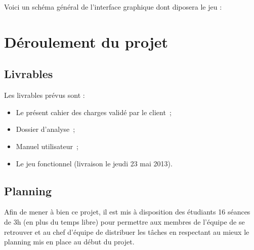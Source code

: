 \documentclass[11pt]{article}
\begin{document}
Voici un schéma général de l'interface graphique dont diposera le jeu :





\newpage %

\section{Déroulement du projet}


\subsection{Livrables}

Les livrables prévus sont :

\begin{itemize}
   \item Le présent cahier des charges validé par le client~;
   \item Dossier d'analyse~;
   \item Manuel utilisateur~;
   \item Le jeu fonctionnel (livraison le jeudi 23 mai 2013).
\end{itemize}


\subsection{Planning}

Afin de mener à bien ce projet, il est mis à disposition des étudiants 16 séances de 3h (en plus du temps libre) pour permettre aux membres de l'équipe de se retrouver et au chef d'équipe de distribuer les tâches en respectant au mieux le planning mis en place au début du projet.
\end{document}
